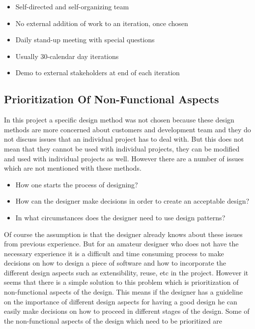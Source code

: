 \documentclass[10pt, a4paper, titlepage]{article}
\begin{document}
\begin{itemize}
\item Self-directed and self-organizing team
\item No external addition of work to an iteration, once chosen
\item Daily stand-up meeting with special questions
\item Usually 30-calendar day iterations
\item Demo to external stakeholders at end of each iteration
\end{itemize}

\subsection{Prioritization Of Non-Functional Aspects}
\label{guideline}

In this project a specific design method was not chosen because these design methods are more concerned about customers and development team and they do not discuss issues that an individual project has to deal with. But this does not mean that they cannot be used with individual projects, they can be modified and used with individual projects as well. However there are a number of issues which are not mentioned with these methods. 

\begin{itemize}
\item How one starts the process of designing?
\item How can the designer make decisions in order to create an acceptable design?
\item In what circumstances does the designer need to use design patterns?
\end{itemize}

Of course the assumption is that the designer already knows about these issues from previous experience. But for an amateur designer who does not have the necessary experience it is a difficult and time consuming process to make decisions on how to design a piece of software and how to incorporate the different design aspects such as extensibility, reuse, etc in the project. However it seems that there is a simple solution to this problem which is prioritization of non-functional aspects of the design. This means if the designer has a guideline on the importance of different design aspects for having a good design he can easily make decisions on how to proceed in different stages of the design. Some of the non-functional aspects of the design which need to be prioritized are  
\end{document}
